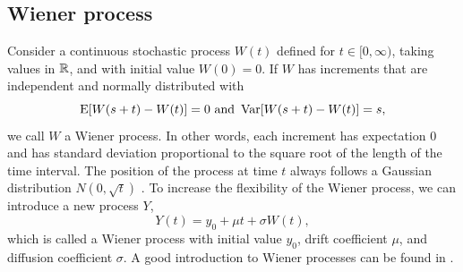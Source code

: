 \subsection{Wiener process}
Consider a continuous stochastic process $W(t)$ defined for $t\in[0,\infty)$, taking values in $\mathbb{R}$, and with initial value $W(0)=0$. If $W$ has increments that are independent and normally distributed with
\begin{equation*}
    \operatorname{E}[W(s+t)-W(t)]=0\text{   and   }\operatorname{Var}[W(s+t)-W(t)]=s,
\end{equation*}
we call $W$ a Wiener process.
In other words, each increment has expectation 0 and has standard deviation proportional to the square root of the length of the time interval.
The position of the process at time $t$ always follows a Gaussian distribution $N(0, \sqrt{t})$ \citep{ABG}.
To increase the flexibility of the Wiener process, we can introduce a new process $Y$,
\begin{equation}\label{wiener}
    Y(t)=y_0+\mu t+\sigma W(t),
\end{equation}
which is called a Wiener process with initial value $y_0$, drift coefficient $\mu$, and diffusion coefficient $\sigma$.
A good introduction to Wiener processes can be found in \citet{cox1965}.

